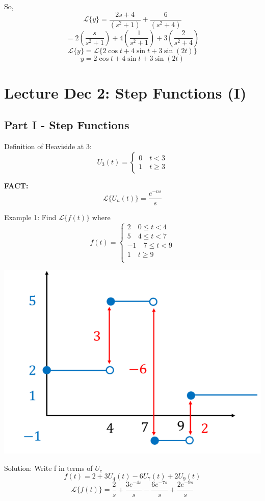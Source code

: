 \documentclass[12pt]{article}
\renewcommand{\L}[1]{\mathcal{L}\{#1\}}
\begin{document}
So, 
\[\L{y} = \frac{2s + 4}{(s^2 + 1)} + \frac{6}{(s^2 + 4)}\]
\[ = 2 \left(\frac{s}{s^2 + 1}\right) + 4\left(\frac{1}{s^2 + 1}\right) + 3\left(\frac{2}{s^2 + 4}\right)\]
\[\L{y} = \L{2\cos t + 4\sin t + 3 \sin(2t)}\]
\[\boxed{y = 2\cos t + 4\sin t + 3\sin(2t)}\]

\section{Lecture Dec 2: Step Functions (I)}
\subsection*{Part I - Step Functions}
Definition of Heaviside at 3:
\[U_3(t) = \begin{cases}
    0 \quad t < 3\\
    1 \quad t \geq 3
\end{cases}\]

\textbf{FACT:}
\[\L{U_n(t)} = \frac{e^{-ns}}{s}\]

Example 1: Find $\L{f(t)}$ where 
\[f(t) = \begin{cases}
    2 \quad 0 \leq t < 4\\
    5 \quad 4 \leq t < 7\\
    -1 \quad 7 \leq t < 9\\
    1 \quad t \geq 9\\
\end{cases}\]

\includegraphics{Images/heaviside.png}

Solution:
Write f in terms of $U_c$
\[f(t) = 2 + 3U_4(t) - 6U_7(t) + 2U_9(t)\]
\[\boxed{\L{f(t)} = \frac{2}{s} + \frac{3e^{-4s}}{s} - \frac{6e^{-7s}}{s} + \frac{2e^{-9s}}{s}}\]
\end{document}
